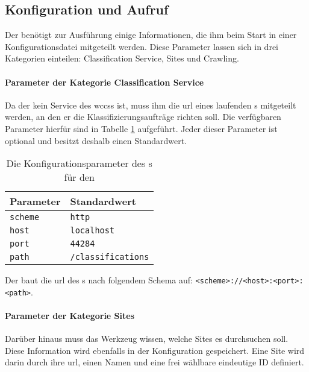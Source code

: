 \subsection{Konfiguration und Aufruf}
    Der {\wordpressCrawler} benötigt zur Ausführung einige Informationen,
    die ihm beim Start in einer Konfigurationsdatei mitgeteilt werden.
    Diese Parameter lassen sich in drei Kategorien einteilen:
    Classification Service, Sites und Crawling.

    \paragraph{Parameter der Kategorie Classification Service}
    Da der {\wordpressCrawler} kein Service des \glspl{wccs} ist,
    muss ihm die \gls{url} eines laufenden {\classificationService}s mitgeteilt werden,
    an den er die Klassifizierungsaufträge richten soll.
    Die verfügbaren Parameter hierfür sind in Tabelle \ref{table:crawlerClassificationServiceParameter} aufgeführt.
    Jeder dieser Parameter ist optional und besitzt deshalb einen Standardwert.

    \begin{table}[]
        \centering
        \begin{tabular}{|l|l|}
            \hline
            \textbf{Parameter} & \textbf{Standardwert}\\
            \hline
            \texttt{scheme} & \texttt{http} \\
            \hline
            \texttt{host} & \texttt{localhost} \\
            \hline
            \texttt{port} & \texttt{44284} \\
            \hline
            \texttt{path} & \texttt{/classifications} \\
            \hline
            \end{tabular}
        \caption{Die Konfigurationsparameter des {\wordpressCrawler}s für den {\classificationService}}
        \label{table:crawlerClassificationServiceParameter}
    \end{table}

    Der {\wordpressCrawler} baut die \gls{url} des {\classificationService}s nach
    folgendem Schema auf: \texttt{<scheme>://<host>:<port>:<path>}.

    \paragraph{Parameter der Kategorie Sites}
    Darüber hinaus muss das Werkzeug wissen,
    welche {\wordpress} Sites es durchsuchen soll.
    Diese Information wird ebenfalls in der Konfiguration gespeichert.
    Eine {\wordpress} Site wird darin durch
    ihre \gls{url}, einen Namen und eine frei wählbare eindeutige ID definiert.

